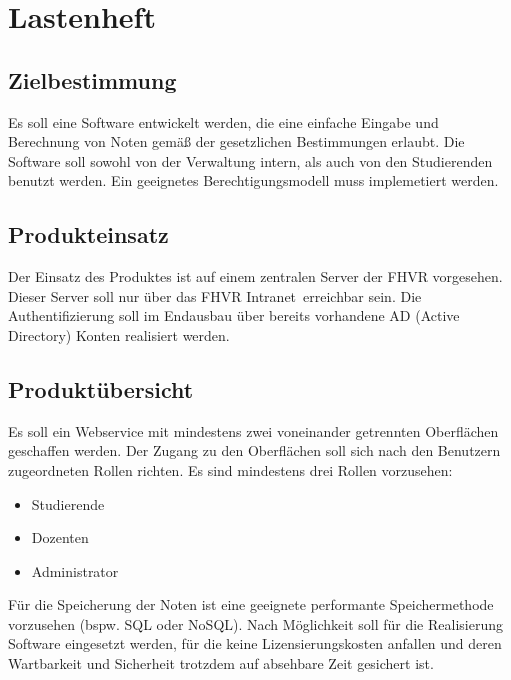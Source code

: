 \documentclass[12pt,a4paper,parskip]{scrreprt}
\begin{document}
\section{Lastenheft}
\subsection{Zielbestimmung}
Es soll eine Software entwickelt werden, die eine einfache Eingabe und Berechnung von Noten gemäß der gesetzlichen Bestimmungen erlaubt. Die Software soll sowohl von der Verwaltung intern, als auch von den Studierenden benutzt werden. Ein geeignetes Berechtigungsmodell muss implemetiert werden.
\subsection{Produkteinsatz}
Der Einsatz des Produktes ist auf einem zentralen Server der FHVR vorgesehen. Dieser Server soll nur über das \glqq FHVR Intranet\grqq\ erreichbar sein. Die Authentifizierung soll im Endausbau über bereits vorhandene AD (Active Directory) Konten realisiert werden.
\subsection{Produktübersicht}
Es soll ein Webservice mit mindestens zwei voneinander getrennten Oberflächen geschaffen werden. Der Zugang zu den Oberflächen soll sich nach den Benutzern zugeordneten Rollen richten. Es sind mindestens drei Rollen vorzusehen:
\begin{itemize}
\item Studierende
\item Dozenten
\item Administrator
\end{itemize}
Für die Speicherung der Noten ist eine geeignete performante Speichermethode vorzusehen (bspw. SQL oder NoSQL).
Nach Möglichkeit soll für die Realisierung Software eingesetzt werden, für die keine Lizensierungskosten anfallen und deren Wartbarkeit und Sicherheit trotzdem auf absehbare Zeit gesichert ist.
\end{document}
